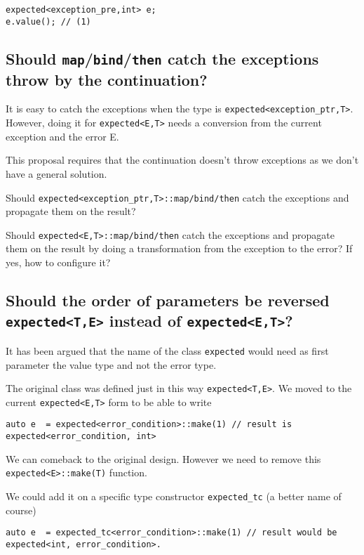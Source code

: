 \documentclass[a4paper,10pt]{article}
\newcommand{\cpp}[1]{\lstinline{#1}}
\begin{document}
\begin{lstlisting}
expected<exception_pre,int> e;
e.value(); // (1)
\end{lstlisting}

\subsection{Should \cpp{map}/\cpp{bind}/\cpp{then} catch the exceptions throw by the continuation?}

It is easy to catch the exceptions when the type is \cpp{expected<exception_ptr,T>}. However, doing it for \cpp{expected<E,T>} needs a conversion from the current exception and the error E.

This proposal requires that the continuation doesn't throw exceptions as we don't have a general solution.

Should  \cpp{expected<exception_ptr,T>::map/bind/then} catch the exceptions and propagate them on the result?

Should  \cpp{expected<E,T>::map/bind/then} catch the exceptions and propagate them on the result by doing a transformation from the exception to the error? If yes, how to configure it?

\subsection{Should the order of parameters be reversed \cpp{expected<T,E>} instead of \cpp{expected<E,T>}?}

It has been argued that the name of the class \cpp{expected} would need as first parameter the value type and not the error type.

The original class was defined just in this way \cpp{expected<T,E>}. We moved to the current \cpp{expected<E,T>} form to be able to write

\begin{lstlisting}
auto e  = expected<error_condition>::make(1) // result is expected<error_condition, int>
\end{lstlisting}

\noindent
We can comeback to the original design. However we need to remove this \cpp{expected<E>::make(T)} function. 

We could add it on a specific type constructor \cpp{expected_tc} (a better name of course)

\begin{lstlisting}
auto e  = expected_tc<error_condition>::make(1) // result would be expected<int, error_condition>.
\end{lstlisting}
\end{document}
